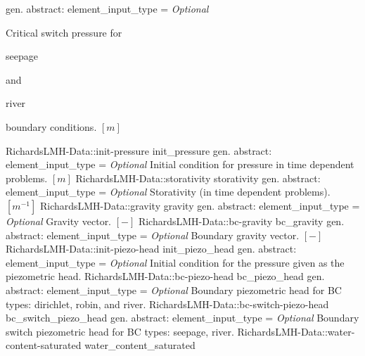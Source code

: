 \begin{RecordType}
			{{gen. abstract: }}{{element{\_}input{\_}type}{ = }}
			{ \it{Optional}}
			{{{Critical switch pressure for }\begin{ttfamily}seepage\end{ttfamily}{ and }\begin{ttfamily}river\end{ttfamily}{ boundary conditions. }{$[m]$}%
}}
		\RecKey
			{RichardsLMH-Data::init-pressure}
			{init{\_}pressure}
			{{gen. abstract: }}{{element{\_}input{\_}type}{ = }}
			{ \it{Optional}}
			{{{Initial condition for pressure in time dependent problems. }{$[m]$}%
}}
		\RecKey
			{RichardsLMH-Data::storativity}
			{storativity}
			{{gen. abstract: }}{{element{\_}input{\_}type}{ = }}
			{ \it{Optional}}
			{{{Storativity (in time dependent problems). }{$[m^{-1}]$}%
}}
		\RecKey
			{RichardsLMH-Data::gravity}
			{gravity}
			{{gen. abstract: }}{{element{\_}input{\_}type}{ = }}
			{ \it{Optional}}
			{{{Gravity vector. }{$[-]$}%
}}
		\RecKey
			{RichardsLMH-Data::bc-gravity}
			{bc{\_}gravity}
			{{gen. abstract: }}{{element{\_}input{\_}type}{ = }}
			{ \it{Optional}}
			{{{Boundary gravity vector. }{$[-]$}%
}}
		\RecKey
			{RichardsLMH-Data::init-piezo-head}
			{init{\_}piezo{\_}head}
			{{gen. abstract: }}{{element{\_}input{\_}type}{ = }}
			{ \it{Optional}}
			{{{Initial condition for the pressure given as the piezometric head.}%
}}
		\RecKey
			{RichardsLMH-Data::bc-piezo-head}
			{bc{\_}piezo{\_}head}
			{{gen. abstract: }}{{element{\_}input{\_}type}{ = }}
			{ \it{Optional}}
			{{{Boundary piezometric head for BC types: dirichlet, robin, and river.}%
}}
		\RecKey
			{RichardsLMH-Data::bc-switch-piezo-head}
			{bc{\_}switch{\_}piezo{\_}head}
			{{gen. abstract: }}{{element{\_}input{\_}type}{ = }}
			{ \it{Optional}}
			{{{Boundary switch piezometric head for BC types: seepage, river.}%
}}
		\RecKey
			{RichardsLMH-Data::water-content-saturated}
			{water{\_}content{\_}saturated}

\end{RecordType}

